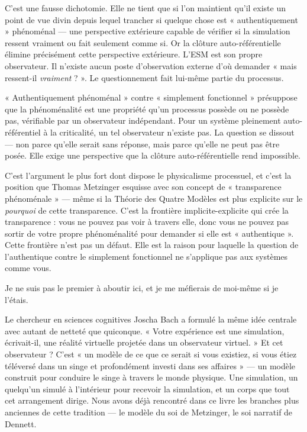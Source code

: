 \documentclass[11pt, twoside, openright]{book}
\begin{document}
C'est une fausse dichotomie. Elle ne tient que si l'on maintient qu'il existe un point de vue divin depuis lequel trancher si quelque chose est « authentiquement » phénoménal --- une perspective extérieure capable de vérifier si la simulation ressent vraiment ou fait seulement comme si. Or la clôture auto-référentielle élimine précisément cette perspective extérieure. L'ESM est son propre observateur. Il n'existe aucun poste d'observation externe d'où demander « mais ressent-il \textit{vraiment} ? ». Le questionnement fait lui-même partie du processus.

« Authentiquement phénoménal » contre « simplement fonctionnel » présuppose que la phénoménalité est une propriété qu'un processus possède ou ne possède pas, vérifiable par un observateur indépendant. Pour un système pleinement auto-référentiel à la criticalité, un tel observateur n'existe pas. La question se dissout --- non parce qu'elle serait sans réponse, mais parce qu'elle ne peut pas être posée. Elle exige une perspective que la clôture auto-référentielle rend impossible.

C'est l'argument le plus fort dont dispose le physicalisme processuel, et c'est la position que Thomas Metzinger esquisse avec son concept de « transparence phénoménale » --- même si la Théorie des Quatre Modèles est plus explicite sur le \textit{pourquoi} de cette transparence. C'est la frontière implicite-explicite qui crée la transparence : vous ne pouvez pas voir à travers elle, donc vous ne pouvez pas sortir de votre propre phénoménalité pour demander si elle est « authentique ». Cette frontière n'est pas un défaut. Elle est la raison pour laquelle la question de l'authentique contre le simplement fonctionnel ne s'applique pas aux systèmes comme vous.

Je ne suis pas le premier à aboutir ici, et je me méfierais de moi-même si je l'étais.

Le chercheur en sciences cognitives Joscha Bach a formulé la même idée centrale avec autant de netteté que quiconque. « Votre expérience est une simulation, écrivait-il, une réalité virtuelle projetée dans un observateur virtuel. » Et cet observateur ? C'est « un modèle de ce que ce serait si vous existiez, si vous étiez téléversé dans un singe et profondément investi dans ses affaires » --- un modèle construit pour conduire le singe à travers le monde physique. Une simulation, un quelqu'un simulé à l'intérieur pour recevoir la simulation, et un corps que tout cet arrangement dirige. Nous avons déjà rencontré dans ce livre les branches plus anciennes de cette tradition --- le modèle du soi de Metzinger, le soi narratif de Dennett.
\end{document}
